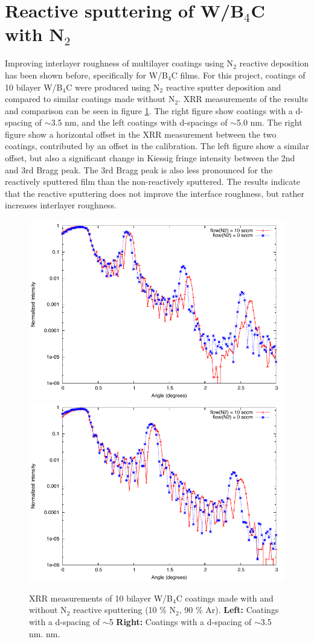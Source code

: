 \section{Reactive sputtering of W/B$_4$C with N$_2$}
Improving interlayer roughness of multilayer coatings using N$_2$ reactive deposition has been shown before\cite{Windt:2007uj,jakobsen2010developing}, specifically for W/B$_4$C films. For this project, coatings of 10 bilayer W/B$_4$C were produced using N$_2$ reactive sputter deposition and compared to similar coatings made without N$_2$. XRR measurements of the results and comparison can be seen in figure \ref{fig:wb4c-n2}. The right figure show coatings with a d-spacing of $\sim$3.5 nm, and the left coatings with d-spacings of $\sim$5.0 nm. The right figure show a horizontal offset in the XRR measurement between the two coatings, contributed by an offset in the calibration. The left figure show a similar offset, but also a significant change in Kiessig fringe intensity between the 2nd and 3rd Bragg peak. The 3rd Bragg peak is also less pronounced for the reactively sputtered film than the non-reactively sputtered. The results indicate that the reactive sputtering does not improve the interface roughness, but rather increases interlayer roughness.

\begin{figure}[!h]
	\center
  \includegraphics[width=0.47\linewidth]{figures/athena/coatings/w-b4c_n2_50AA.pdf}	\includegraphics[width=0.47\linewidth]{figures/athena/coatings/w-b4c_n2_35AA.pdf}
\caption{\footnotesize XRR measurements of 10 bilayer W/B$_4$C coatings made with and without N$_2$ reactive sputtering (10 \% N$_2$, 90 \% Ar).  \textbf{Left:} Coatings with a d-spacing of $\sim$5 \textbf{Right:} Coatings with a d-spacing of $\sim$3.5 nm. nm.}\label{fig:wb4c-n2}
\end{figure}


